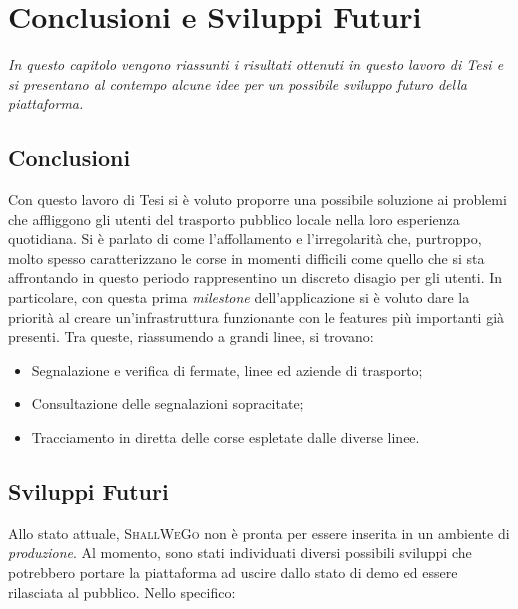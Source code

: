 \chapter{Conclusioni e Sviluppi Futuri} %
%


\begin{citazione}
	\textit{In questo capitolo vengono riassunti i risultati ottenuti in questo lavoro di Tesi e si presentano al contempo alcune idee per un possibile sviluppo futuro della piattaforma.}
\end{citazione}

\newpage

\section{Conclusioni}
	Con questo lavoro di Tesi si è voluto proporre una possibile soluzione ai problemi che affliggono gli utenti del trasporto pubblico locale nella loro esperienza quotidiana. Si è parlato di come l'affollamento e l'irregolarità che, purtroppo, molto spesso caratterizzano le corse in momenti difficili come quello che si sta affrontando in questo periodo rappresentino un discreto disagio per gli utenti. In particolare, con questa prima \textit{milestone} dell'applicazione si è voluto dare la priorità al creare un'infrastruttura funzionante con le features più importanti già presenti. Tra queste, riassumendo a grandi linee, si trovano: 
	\begin{itemize}
		\item Segnalazione e verifica di fermate, linee ed aziende di trasporto;
		\item Consultazione delle segnalazioni sopracitate;
		\item Tracciamento in diretta delle corse espletate dalle diverse linee.
	\end{itemize}

	\section{Sviluppi Futuri}
		Allo stato attuale, \textsc{ShallWeGo} non è pronta per essere inserita in un ambiente di \textit{produzione}. Al momento, sono stati individuati diversi possibili sviluppi che potrebbero portare la piattaforma ad uscire dallo stato di demo ed essere rilasciata al pubblico. Nello specifico: 

